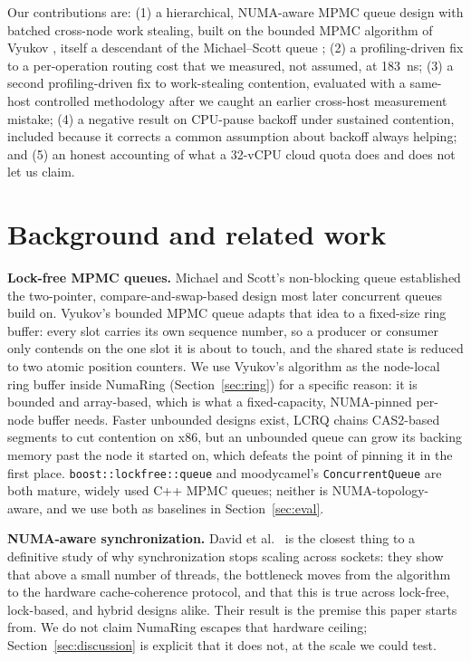 \documentclass[10pt,journal,compsoc]{IEEEtran}
\begin{document}
Our contributions are: (1) a hierarchical, NUMA-aware MPMC queue design with batched cross-node
work stealing, built on the bounded MPMC algorithm of Vyukov \cite{vyukov_bounded_mpmc}, itself a
descendant of the Michael--Scott queue \cite{michael1996simple}; (2) a profiling-driven fix to a
per-operation routing cost that we measured, not assumed, at \SI{183}{\nano\second}; (3) a second
profiling-driven fix to work-stealing contention, evaluated with a same-host controlled
methodology after we caught an earlier cross-host measurement mistake; (4) a negative result on
CPU-pause backoff under sustained contention, included because it corrects a common assumption
about backoff always helping; and (5) an honest accounting of what a 32-vCPU cloud quota does and
does not let us claim.

\section{Background and related work}

\textbf{Lock-free MPMC queues.} Michael and Scott's non-blocking queue \cite{michael1996simple}
established the two-pointer, compare-and-swap-based design most later concurrent queues build on.
Vyukov's bounded MPMC queue \cite{vyukov_bounded_mpmc} adapts that idea to a fixed-size ring
buffer: every slot carries its own sequence number, so a producer or consumer only contends on the
one slot it is about to touch, and the shared state is reduced to two atomic position counters. We
use Vyukov's algorithm as the node-local ring buffer inside NumaRing (Section~\ref{sec:ring}) for a
specific reason: it is bounded and array-based, which is what a fixed-capacity, NUMA-pinned
per-node buffer needs. Faster unbounded designs exist, LCRQ \cite{morrison2013lcrq} chains
CAS2-based segments to cut contention on x86, but an unbounded queue can grow its backing memory
past the node it started on, which defeats the point of pinning it in the first place.
\texttt{boost::lockfree::queue} \cite{boost_lockfree} and moodycamel's
\texttt{ConcurrentQueue} \cite{desrochers2014moodycamel} are both mature, widely used C++ MPMC
queues; neither is NUMA-topology-aware, and we use both as baselines in
Section~\ref{sec:eval}.

\textbf{NUMA-aware synchronization.} David et al.\ \cite{david2013everything} is the closest
thing to a definitive study of why synchronization stops scaling across sockets: they show that
above a small number of threads, the bottleneck moves from the algorithm to the hardware
cache-coherence protocol, and that this is true across lock-free, lock-based, and hybrid designs
alike. Their result is the premise this paper starts from. We do not claim NumaRing escapes that
hardware ceiling; Section~\ref{sec:discussion} is explicit that it does not, at the scale we could
test.
\end{document}
